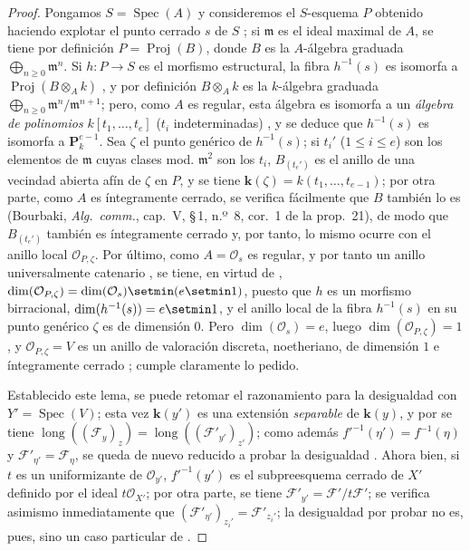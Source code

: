 \begin{proof}
Pongamos $S=\operatorname{Spec}(A)$ y consideremos el $S$-esquema $P$ obtenido haciendo explotar el punto cerrado $s$ de $S$ ; si $\mathfrak m$ es el ideal maximal de $A$, se tiene por definición 
$P=\operatorname{Proj}(B)$, donde $B$ es la $A$-álgebra graduada $\bigoplus_{n\geqslant0}\mathfrak m^n$.
Si $h:P\to S$ es el morfismo estructural, la fibra $h^{-1}(s)$ es isomorfa a $\operatorname{Proj}(B\otimes_A k)$ , y por definición $B\otimes_A k$ es la $k$-álgebra graduada $\bigoplus_{n\geqslant0}\mathfrak m^n/\mathfrak m^{n+1}$; pero, como $A$ es regular, esta álgebra es isomorfa a un \emph{álgebra de polinomios} $k[t_1,\ldots,t_e]$ ($t_i$ indeterminadas) , y se deduce que $h^{-1}(s)$ es isomorfa a $\mathbf P_k^{e-1}$.
Sea $\zeta$ el punto genérico de $h^{-1}(s)$; si $t_i'$ ($1\leqslant i\leqslant e$) son los elementos de $\mathfrak m$ cuyas clases mod. $\mathfrak m^2$ son los $t_i$, $B_{(t_e')}$ es el anillo de una vecindad abierta afín de $\zeta$ en $P$, y se tiene $\boldsymbol{k}(\zeta)=k(t_1,\ldots,t_{e-1})$; por otra parte, como $A$ es íntegramente cerrado, se verifica fácilmente que $B$ también lo es (Bourbaki, \emph{Alg.\ comm.}, cap.~V, \S\,1, n.º~8, cor.~1 de la prop.~21), de modo que $B_{(t_e')}$ también es íntegramente cerrado y, por tanto, lo mismo ocurre con el anillo local $\mathcal O_{P,\zeta}$.
Por último, como $A=\mathcal O_s$ es regular, y por tanto un anillo universalmente catenario , se tiene, en virtud de , $\dim(\mathcal O_{P,\zeta})=\dim(\mathcal O_s)\setmin(e\setmin 1)$, puesto que $h$ es un morfismo birracional, $\dim(h^{-1}(s))=e\setmin 1$, y el anillo local de la fibra $h^{-1}(s)$ en su punto genérico $\zeta$ es de dimensión $0$.
Pero $\dim(\mathcal O_s)=e$, luego $\dim(\mathcal O_{P,\zeta})=1$, y $\mathcal O_{P,\zeta}=V$ es un anillo de valoración discreta, noetheriano, de dimensión $1$ e íntegramente cerrado ; cumple claramente lo pedido.

Establecido este lema, se puede retomar el razonamiento para la desigualdad  con $Y'=\operatorname{Spec}(V)$; esta vez $\boldsymbol{k}(y')$ es una extensión \emph{separable} de $\boldsymbol{k}(y)$, y por  se tiene $\operatorname{long}((\mathcal F_y)_z)=
\operatorname{long}((\mathcal F'_{y'})_{z'})$; como además $f'^{-1}(\eta')=f^{-1}(\eta)$ y $\mathcal F'_{\eta'}=\mathcal F_\eta$, se queda de nuevo reducido a probar la desigualdad .
Ahora bien, si $t$ es un uniformizante de $\mathcal O_{y'}$, $f'^{-1}(y')$ es el subpreesquema cerrado de $X'$ definido por el ideal $t\mathcal O_{X'}$; por otra parte, se tiene $\mathcal F'_{y'}=\mathcal F'/t\mathcal F'$; se verifica asimismo inmediatamente  que $(\mathcal F'_{\eta'})_{z_i'}=\mathcal F'_{z_i'}$; la desigualdad por probar  no es, pues, sino un caso particular de .
\end{proof}

